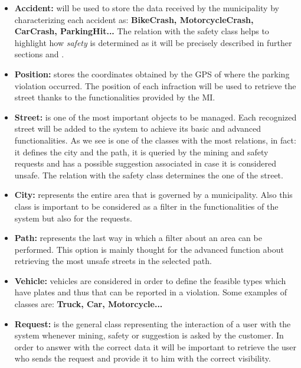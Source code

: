 \begin{itemize}
		\item \textbf{Accident:} will be used to store the data received by the municipality by characterizing each accident as: \textbf{BikeCrash, MotorcycleCrash, CarCrash, ParkingHit...} The relation with the safety class helps to highlight how \emph{safety} is determined as it will be precisely described in further sections  and .
		
		\item \textbf{Position:} stores the coordinates obtained by the GPS of where the parking violation occurred. The position of each infraction will be used to retrieve the street thanks to the functionalities provided by the MI.
		
		\item \textbf{Street:} is one of the most important objects to be managed. Each recognized street will be added to the system to achieve its basic and advanced functionalities. As we see is one of the classes with the most relations, in fact: it defines the city and the path, it is queried by the mining and safety requests and has a possible suggestion associated in case it is considered unsafe. The relation with the safety class determines the one of the street.
		
		\item \textbf{City:} represents the entire area that is governed by a municipality. Also this class is important to be considered as a filter in the functionalities of the system but also for the requests.
		
		\item \textbf{Path:} represents the last way in which a filter about an area can be performed. This option is mainly thought for the advanced function about retrieving the most unsafe streets in the selected path.
		
		\item \textbf{Vehicle:} vehicles are considered in order to define the feasible types which have plates and thus that can be reported in a violation. Some examples of classes are: \textbf{Truck, Car, Motorcycle...}
		
		\item \textbf{Request:} is the general class representing the interaction of a user with the system whenever mining, safety or suggestion is asked by the customer. In order to answer with the correct data it will be important to retrieve the user who sends the request and provide it to him with the correct visibility.
		

\end{itemize}
